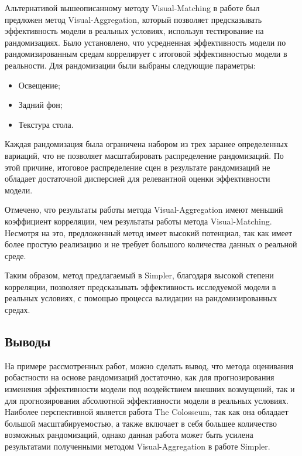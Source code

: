             Альтернативой вышеописанному методу Visual-Matching в работе был предложен метод Visual-Aggregation, который позволяет предсказывать эффективность модели в реальных условиях, используя тестирование на рандомизациях. Было установлено, что усредненная эффективность модели по рандомизированным средам коррелирует с итоговой эффективностью модели в реальности. Для рандомизации были выбраны следующие параметры:~\begin{itemize}
                \item Освещение;
                \item Задний фон;
                \item Текстура стола.
            \end{itemize}
            
            Каждая рандомизация была ограничена набором из трех заранее определенных вариаций, что не позволяет масштабировать распределение рандомизаций. По этой причине, итоговое распределение сцен в результате рандомизаций не обладает достаточной дисперсией для релевантной оценки эффективности модели. 

            Отмечено, что результаты работы метода Visual-Aggregation имеют меньший коэффициент корреляции, чем результаты работы метода Visual-Matching. Несмотря на это, предложенный метод имеет высокий потенциал, так как имеет более простую реализацию и не требует большого количества данных о реальной среде. 
            
            Таким образом, метод предлагаемый в Simpler, благодаря высокой степени корреляции, позволяет предсказывать эффективность исследуемой модели в реальных условиях, с помощью процесса валидации на рандомизированных средах. 
    
        \subsection{Выводы}

        На примере рассмотренных работ, можно сделать вывод, что метода оценивания робастности на основе рандомизаций достаточно, как для прогнозирования изменения эффективности модели под воздействием внешних возмущений, так и для прогнозирования абсолютной эффективности модели в реальных условиях. Наиболее перспективной является работа The Colosseum, так как она обладает большой масштабируемостью, а также включает в себя большее количество возможных рандомизаций, однако данная работа может быть усилена результатами полученными методом Visual-Aggregation в работе Simpler. 

